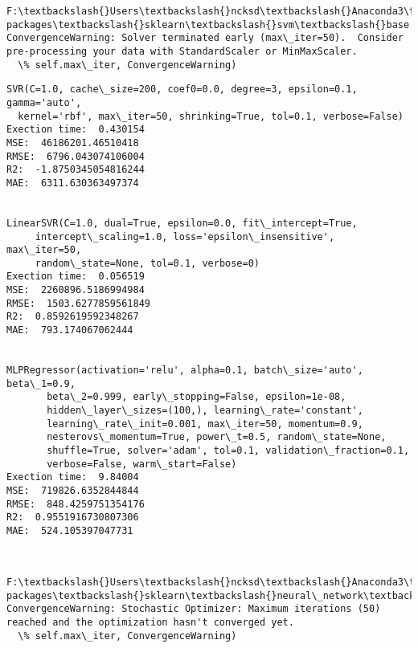 \documentclass[11pt]{article}
\begin{document}
    \begin{Verbatim}[commandchars=\\\{\}]
F:\textbackslash{}Users\textbackslash{}ncksd\textbackslash{}Anaconda3\textbackslash{}lib\textbackslash{}site-packages\textbackslash{}sklearn\textbackslash{}svm\textbackslash{}base.py:218: ConvergenceWarning: Solver terminated early (max\_iter=50).  Consider pre-processing your data with StandardScaler or MinMaxScaler.
  \% self.max\_iter, ConvergenceWarning)

    \end{Verbatim}

    \begin{Verbatim}[commandchars=\\\{\}]
SVR(C=1.0, cache\_size=200, coef0=0.0, degree=3, epsilon=0.1, gamma='auto',
  kernel='rbf', max\_iter=50, shrinking=True, tol=0.1, verbose=False)
Exection time:  0.430154
MSE:  46186201.46510418
RMSE:  6796.043074106004
R2:  -1.8750345054816244
MAE:  6311.630363497374


LinearSVR(C=1.0, dual=True, epsilon=0.0, fit\_intercept=True,
     intercept\_scaling=1.0, loss='epsilon\_insensitive', max\_iter=50,
     random\_state=None, tol=0.1, verbose=0)
Exection time:  0.056519
MSE:  2260896.5186994984
RMSE:  1503.6277859561849
R2:  0.8592619592348267
MAE:  793.174067062444


MLPRegressor(activation='relu', alpha=0.1, batch\_size='auto', beta\_1=0.9,
       beta\_2=0.999, early\_stopping=False, epsilon=1e-08,
       hidden\_layer\_sizes=(100,), learning\_rate='constant',
       learning\_rate\_init=0.001, max\_iter=50, momentum=0.9,
       nesterovs\_momentum=True, power\_t=0.5, random\_state=None,
       shuffle=True, solver='adam', tol=0.1, validation\_fraction=0.1,
       verbose=False, warm\_start=False)
Exection time:  9.84004
MSE:  719826.6352844844
RMSE:  848.4259751354176
R2:  0.9551916730807306
MAE:  524.105397047731



    \end{Verbatim}

    \begin{Verbatim}[commandchars=\\\{\}]
F:\textbackslash{}Users\textbackslash{}ncksd\textbackslash{}Anaconda3\textbackslash{}lib\textbackslash{}site-packages\textbackslash{}sklearn\textbackslash{}neural\_network\textbackslash{}multilayer\_perceptron.py:564: ConvergenceWarning: Stochastic Optimizer: Maximum iterations (50) reached and the optimization hasn't converged yet.
  \% self.max\_iter, ConvergenceWarning)

    \end{Verbatim}
\end{document}
